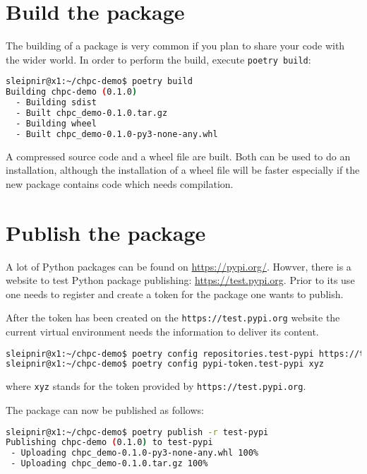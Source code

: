 \documentclass[10pt]{article}
\begin{document}
\section{Build the package}
The building of a package is very common if you plan to share your code with the wider world.
In order to perform the build, execute \texttt{poetry build}:
\begin{lstlisting}[language=bash]
sleipnir@x1:~/chpc-demo$ poetry build
Building chpc-demo (0.1.0)
  - Building sdist
  - Built chpc_demo-0.1.0.tar.gz
  - Building wheel
  - Built chpc_demo-0.1.0-py3-none-any.whl
\end{lstlisting}
A compressed source code and a wheel file are built.
Both can be used to do an installation, although the installation of a wheel file will be faster
especially if the new package contains code which needs compilation.

\section{Publish the package}
A lot of Python packages can be found on \href{https://pypi.org/}{https://pypi.org/}. 
Howver, there is a website to test Python package publishing: \href{https://test.pypi.org}{https://test.pypi.org}.
Prior to its use one needs to register and create a token for the package one wants to publish.

After the token has been created on the \texttt{https://test.pypi.org} website the current virtual environment 
needs the information to deliver its content.
\begin{lstlisting}[language=bash]
sleipnir@x1:~/chpc-demo$ poetry config repositories.test-pypi https://test.pypi.org/legacy/
sleipnir@x1:~/chpc-demo$ poetry config pypi-token.test-pypi xyz
\end{lstlisting}
where \texttt{xyz} stands for the token provided by \texttt{https://test.pypi.org}.

The package can now be published as follows:
\begin{lstlisting}[language=bash]
sleipnir@x1:~/chpc-demo$ poetry publish -r test-pypi
Publishing chpc-demo (0.1.0) to test-pypi
 - Uploading chpc_demo-0.1.0-py3-none-any.whl 100%
 - Uploading chpc_demo-0.1.0.tar.gz 100%
\end{lstlisting}
\end{document}
